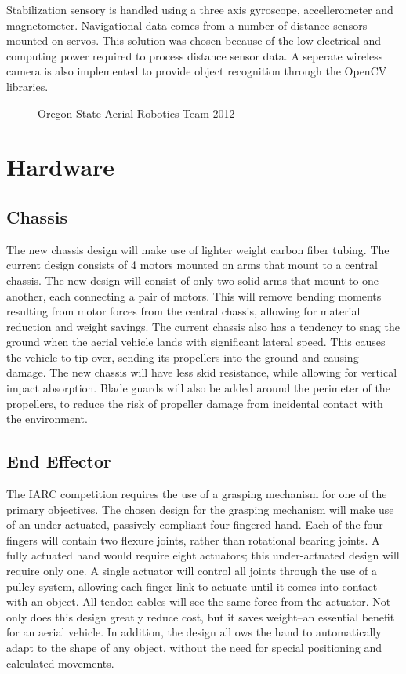 \documentclass[12pt,letterpaper]{article}
\begin{document}
Stabilization sensory is handled using a three axis gyroscope, 
accellerometer and magnetometer. Navigational data comes from a number of
distance sensors mounted on servos. This solution was chosen because of the
low electrical and computing power required to process distance sensor data.
A seperate wireless camera is also implemented to provide object recognition
through the OpenCV libraries.


\begin{figure}[h!]
\caption{Oregon State Aerial Robotics Team 2012}
\end{figure}


\section*{Hardware}

\subsection*{Chassis}

The new chassis design will make use of lighter weight carbon fiber tubing.  The
 current design consists of 4 motors mounted on arms that mount to a central
chassis.  The new design will consist of only two solid arms that mount to one
another, each connecting a pair of motors.  This will remove bending moments
resulting from motor forces from the central chassis, allowing for material
reduction and weight savings.  The current chassis also has a tendency to snag
the ground when the aerial vehicle lands with significant lateral speed.  This
causes the vehicle to tip over, sending its propellers into the ground and
causing damage.  The new chassis will have less skid resistance, while allowing
for vertical impact absorption.  Blade guards will also be added around the
perimeter of the propellers, to reduce the risk of propeller damage from
incidental contact with the environment.


\subsection*{End Effector}

The IARC competition requires the use of a grasping mechanism for one of the
primary objectives.  The chosen design for the grasping mechanism will make use
of an under-actuated, passively compliant four-fingered hand.  Each of the four
fingers will contain two flexure joints, rather than rotational bearing joints.
A fully actuated hand would require eight actuators; this under-actuated design
will require only one.  A single actuator will control all joints through the
use of a pulley system, allowing each finger link to actuate until it comes into
 contact with an object.  All tendon cables will see the same force from the
actuator.  Not only does this design greatly reduce cost, but it saves
weight--an essential benefit for an aerial vehicle.  In addition, the design all
ows the hand to automatically adapt to the shape of any object, without the need
 for special positioning and calculated movements.
\end{document}
